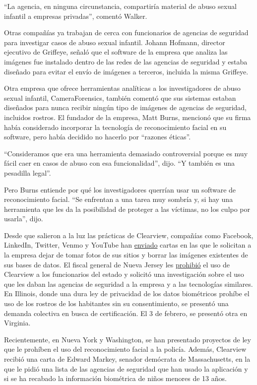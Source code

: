 ``La agencia, en ninguna circunstancia, compartiría material de abuso
sexual infantil a empresas privadas'', comentó Walker.

Otras compañías ya trabajan de cerca con funcionarios de agencias de
seguridad para investigar casos de abuso sexual infantil. Johann
Hofmann, director ejecutivo de Griffeye, señaló que el software de la
empresa que analiza las imágenes fue instalado dentro de las redes de
las agencias de seguridad y estaba diseñado para evitar el envío de
imágenes a terceros, incluida la misma Griffeye.

Otra empresa que ofrece herramientas analíticas a los investigadores de
abuso sexual infantil, CameraForensics, también comentó que sus sistemas
estaban diseñados para nunca recibir ningún tipo de imágenes de agencias
de seguridad, incluidos rostros. El fundador de la empresa, Matt Burns,
mencionó que su firma había considerado incorporar la tecnología de
reconocimiento facial en su software, pero había decidido no hacerlo por
``razones éticas''.

``Consideramos que era una herramienta demasiado controversial porque es
muy fácil caer en casos de abuso con esa funcionalidad'', dijo. ``Y
también es una pesadilla legal''.

Pero Burns entiende por qué los investigadores querrían usar un software
de reconocimiento facial. ``Se enfrentan a una tarea muy sombría y, si
hay una herramienta que les da la posibilidad de proteger a las
víctimas, no los culpo por usarla'', dijo.

Desde que salieron a la luz las prácticas de Clearview, compañías como
Facebook, LinkedIn, Twitter, Venmo y YouTube han
\href{https://www.nytimes3xbfgragh.onion/2020/01/22/technology/clearview-ai-twitter-letter.html}{enviado}
cartas en las que le solicitan a la empresa dejar de tomar fotos de sus
sitios y borrar las imágenes existentes de sus bases de datos. El fiscal
general de Nueva Jersey les
\href{https://www.nytimes3xbfgragh.onion/2020/01/24/technology/clearview-ai-new-jersey.html}{prohibió}
el uso de Clearview a los funcionarios del estado y solicitó una
investigación sobre el uso que les daban las agencias de seguridad a la
empresa y a las tecnologías similares. En Illinois, donde una dura ley
de privacidad de los datos biométricos prohíbe el uso de los rostros de
los habitantes sin su consentimiento, se presentó una demanda colectiva
en busca de certificación. El 3 de febrero, se presentó otra en
Virginia.

Recientemente, en Nueva York y Washington, se han presentado proyectos
de ley que le prohíben el uso del reconocimiento facial a la policía.
Además, Clearview recibió una carta de Edward Markey, senador demócrata
de Massachusetts, en la que le pidió una lista de las agencias de
seguridad que han usado la aplicación y si se ha recabado la información
biométrica de niños menores de 13 años.

